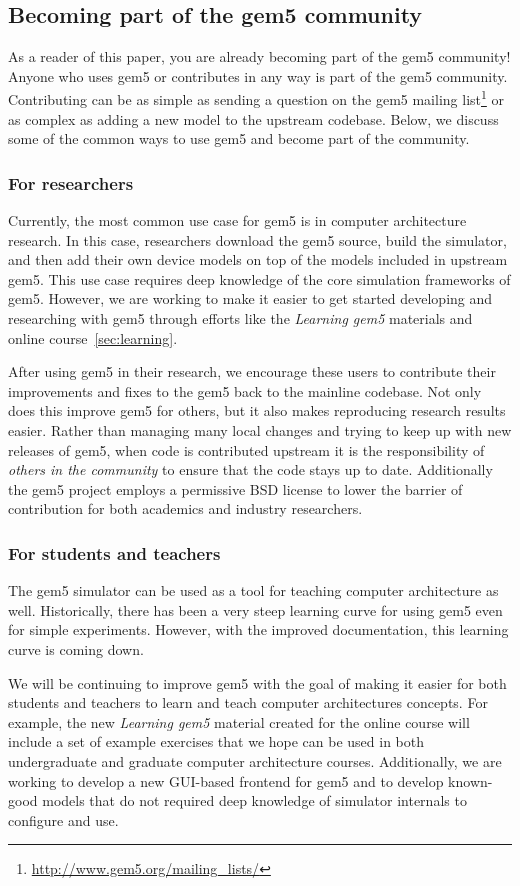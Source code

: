 \subsection{Becoming part of the gem5 community}

As a reader of this paper, you are already becoming part of the gem5 community!
Anyone who uses gem5 or contributes in any way is part of the gem5 community.
Contributing can be as simple as sending a question on the gem5 mailing list\footnote{\url{http://www.gem5.org/mailing_lists/}} or as complex as adding a new model to the upstream codebase.
Below, we discuss some of the common ways to use gem5 and become part of the community.

\subsubsection{For researchers}

Currently, the most common use case for gem5 is in computer architecture research.
In this case, researchers download the gem5 source, build the simulator, and then add their own device models on top of the models included in upstream gem5.
This use case requires deep knowledge of the core simulation frameworks of gem5.
However, we are working to make it easier to get started developing and researching with gem5 through efforts like the \emph{Learning gem5} materials and online course~\ref{sec:learning}.

After using gem5 in their research, we encourage these users to contribute their improvements and fixes to the gem5 back to the mainline codebase.
Not only does this improve gem5 for others, but it also makes reproducing research results easier.
Rather than managing many local changes and trying to keep up with new releases of gem5, when code is contributed upstream it is the responsibility of \emph{others in the community} to ensure that the code stays up to date.
Additionally the gem5 project employs a permissive BSD license to lower the barrier of contribution for both academics and industry researchers.

\subsubsection{For students and teachers}

The gem5 simulator can be used as a tool for teaching computer architecture as well.
Historically, there has been a very steep learning curve for using gem5 even for simple experiments.
However, with the improved documentation, this learning curve is coming down.

We will be continuing to improve gem5 with the goal of making it easier for both students and teachers to learn and teach computer architectures concepts.
For example, the new \emph{Learning gem5} material created for the online course will include a set of example exercises that we hope can be used in both undergraduate and graduate computer architecture courses.
Additionally, we are working to develop a new GUI-based frontend for gem5 and to develop known-good models that do not required deep knowledge of simulator internals to configure and use.
